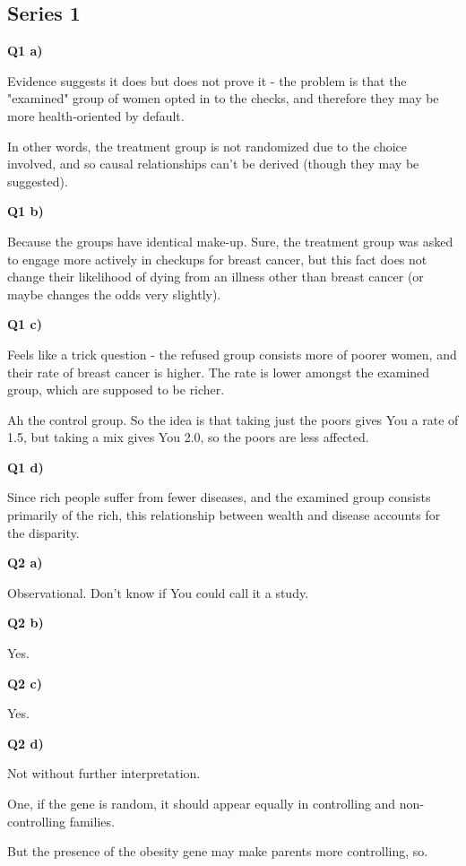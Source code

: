 \documentclass{article}
\begin{document}
	\subsection{Series 1}
	
		\textbf{Q1 a)}
		
			Evidence suggests it does but does not prove it - the problem is that the "examined" group of women opted in to the checks, and therefore they may be more health-oriented by default. 
			
			In other words, the treatment group is not randomized due to the choice involved, and so causal relationships can't be derived (though they may be suggested).
			
		\textbf{Q1 b)}
		
			Because the groups have identical make-up. Sure, the treatment group was asked to engage more actively in checkups for breast cancer, but this fact does not change their likelihood of dying from an illness other than breast cancer (or maybe changes the odds very slightly).
			
		\textbf{Q1 c)}
		
			Feels like a trick question - the refused group consists more of poorer women, and their rate of breast cancer is higher. The rate is lower amongst the examined group, which are supposed to be richer.
			
			Ah the control group. So the idea is that taking just the poors gives You a rate of 1.5, but taking a mix gives You 2.0, so the poors are less affected.
			
		\textbf{Q1 d)}
		
			Since rich people suffer from fewer diseases, and the examined group consists primarily of the rich, this relationship between wealth and disease accounts for the disparity.
			
		\textbf{Q2 a)}
		
			Observational. Don't know if You could call it a study.
			
		\textbf{Q2 b)}
		
			Yes.
			
		\textbf{Q2 c)}
		
			Yes.
			
		\textbf{Q2 d)}
		
			Not without further interpretation. 
			
			One, if the gene is random, it should appear equally in controlling and non-controlling families.
			
			But the presence of the obesity gene may make parents more controlling, so.
			
\end{document}
